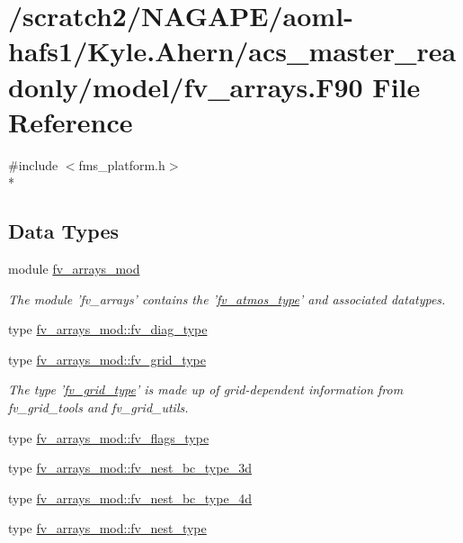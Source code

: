 \section{/scratch2/\-N\-A\-G\-A\-P\-E/aoml-\/hafs1/\-Kyle.Ahern/acs\-\_\-master\-\_\-readonly/model/fv\-\_\-arrays.F90 File Reference}
\label{fv__arrays_8F90}
{\ttfamily \#include $<$fms\-\_\-platform.\-h$>$}\\*
\subsection*{Data Types}
\begin{DoxyCompactItemize}
\item 
module \hyperlink{classfv__arrays__mod}{fv\-\_\-arrays\-\_\-mod}
\begin{DoxyCompactList}\small\item\em The module 'fv\-\_\-arrays' contains the '\hyperlink{structfv__arrays__mod_1_1fv__atmos__type}{fv\-\_\-atmos\-\_\-type}' and associated datatypes. \end{DoxyCompactList}\item 
type \hyperlink{structfv__arrays__mod_1_1fv__diag__type}{fv\-\_\-arrays\-\_\-mod\-::fv\-\_\-diag\-\_\-type}
\item 
type \hyperlink{structfv__arrays__mod_1_1fv__grid__type}{fv\-\_\-arrays\-\_\-mod\-::fv\-\_\-grid\-\_\-type}
\begin{DoxyCompactList}\small\item\em The type '\hyperlink{structfv__arrays__mod_1_1fv__grid__type}{fv\-\_\-grid\-\_\-type}' is made up of grid-\/dependent information from fv\-\_\-grid\-\_\-tools and fv\-\_\-grid\-\_\-utils. \end{DoxyCompactList}\item 
type \hyperlink{structfv__arrays__mod_1_1fv__flags__type}{fv\-\_\-arrays\-\_\-mod\-::fv\-\_\-flags\-\_\-type}
\item 
type \hyperlink{structfv__arrays__mod_1_1fv__nest__bc__type__3d}{fv\-\_\-arrays\-\_\-mod\-::fv\-\_\-nest\-\_\-bc\-\_\-type\-\_\-3d}
\item 
type \hyperlink{structfv__arrays__mod_1_1fv__nest__bc__type__4d}{fv\-\_\-arrays\-\_\-mod\-::fv\-\_\-nest\-\_\-bc\-\_\-type\-\_\-4d}
\item 
type \hyperlink{structfv__arrays__mod_1_1fv__nest__type}{fv\-\_\-arrays\-\_\-mod\-::fv\-\_\-nest\-\_\-type}

\end{DoxyCompactItemize}
